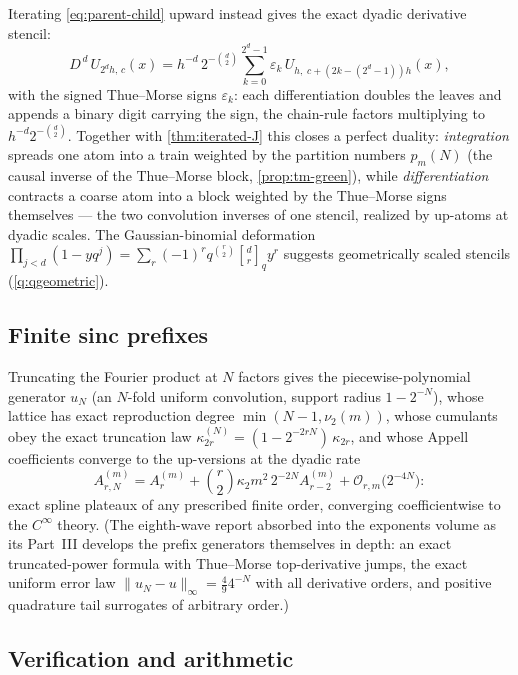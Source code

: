 \documentclass[11pt,oneside]{article}
\numberwithin{equation}{section}
\theoremstyle{definition}
\theoremstyle{remark}
\newcommand{\bigO}{\mathcal O}
\newcommand{\eps}{\varepsilon}
\newcommand{\vtwo}{\nu_2}
\begin{document}
Iterating \eqref{eq:parent-child} upward instead gives the exact
dyadic derivative stencil:
\begin{equation}
 \boxed{\;
 D^{\,d}\,U_{2^{d}h,\,c}(x)
 =h^{-d}\,2^{-\binom d2}
 \sum_{k=0}^{2^{d}-1}\eps_k\,
 U_{h,\;c+(2k-(2^{d}-1))h}(x),
 \;}
 \label{eq:tm-stencil}
\end{equation}
with the signed Thue--Morse signs $\eps_k$: each differentiation
doubles the leaves and appends a binary digit carrying the sign, the
chain-rule factors multiplying to $h^{-d}2^{-\binom d2}$.  Together
with \cref{thm:iterated-J} this closes a perfect duality:
\emph{integration} spreads one atom into a train weighted by the
partition numbers $p_m(N)$ (the causal inverse of the Thue--Morse
block, \cref{prop:tm-green}), while \emph{differentiation} contracts
a coarse atom into a block weighted by the Thue--Morse signs
themselves --- the two convolution inverses of one stencil, realized
by up-atoms at dyadic scales.  The Gaussian-binomial deformation
$\prod_{j<d}(1-yq^{j})
=\sum_r(-1)^{r}q^{\binom r2}\genfrac{[}{]}{0pt}{}{d}{r}_q y^{r}$
suggests geometrically scaled stencils
(\cref{q:qgeometric}).

\subsection{Finite sinc prefixes}

Truncating the Fourier product at $N$ factors gives the
piecewise-polynomial generator $u_N$ (an $N$-fold uniform
convolution, support radius $1-2^{-N}$), whose lattice has exact
reproduction degree $\min(N-1,\vtwo(m))$, whose cumulants obey the
exact truncation law
$\kappa^{(N)}_{2r}=(1-2^{-2rN})\,\kappa_{2r}$, and whose Appell
coefficients converge to the up-versions at the dyadic rate
\begin{equation}
 A^{(m)}_{r,N}=A^{(m)}_r
 +\binom r2\kappa_2m^{2}\,2^{-2N}A^{(m)}_{r-2}
 +\bigO_{r,m}\bigl(2^{-4N}\bigr):
 \label{eq:finite-appell}
\end{equation}
exact spline plateaux of any prescribed finite order, converging
coefficientwise to the $C^\infty$ theory.  (The eighth-wave report
absorbed into the exponents volume as its Part~III develops the
prefix generators themselves in depth: an exact truncated-power
formula with Thue--Morse top-derivative jumps, the exact uniform
error law $\lVert u_N-u\rVert_\infty=\tfrac{4}{9}4^{-N}$ with all
derivative orders, and positive quadrature tail surrogates of
arbitrary order.)

\subsection{Verification and arithmetic}
\end{document}
